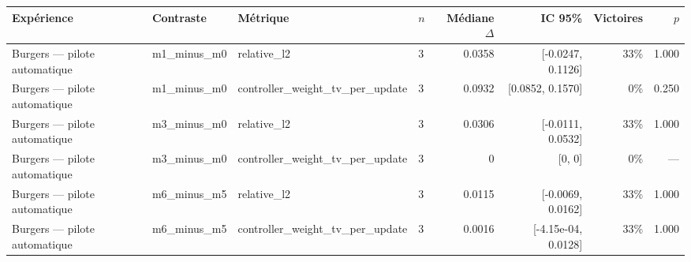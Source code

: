 \begin{tabular}{llllrrrr}
\toprule
Expérience & Contraste & Métrique & $n$ & Médiane $\Delta$ & IC 95\% & Victoires & $p$ \\
\midrule
Burgers — pilote automatique & m1\_minus\_m0 & relative\_l2 & 3 & 0.0358 & [-0.0247, 0.1126] & 33\% & 1.000 \\
Burgers — pilote automatique & m1\_minus\_m0 & controller\_weight\_tv\_per\_update & 3 & 0.0932 & [0.0852, 0.1570] & 0\% & 0.250 \\
Burgers — pilote automatique & m3\_minus\_m0 & relative\_l2 & 3 & 0.0306 & [-0.0111, 0.0532] & 33\% & 1.000 \\
Burgers — pilote automatique & m3\_minus\_m0 & controller\_weight\_tv\_per\_update & 3 & 0 & [0, 0] & 0\% & — \\
Burgers — pilote automatique & m6\_minus\_m5 & relative\_l2 & 3 & 0.0115 & [-0.0069, 0.0162] & 33\% & 1.000 \\
Burgers — pilote automatique & m6\_minus\_m5 & controller\_weight\_tv\_per\_update & 3 & 0.0016 & [-4.15e-04, 0.0128] & 33\% & 1.000 \\
\bottomrule
\end{tabular}
